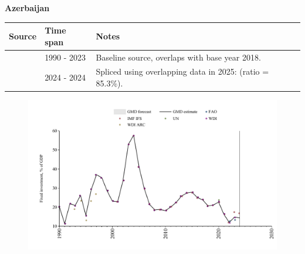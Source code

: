 \documentclass[12pt,a4paper,landscape]{article}
\begin{document}
\begin{adjustbox}{max totalsize={\paperwidth}{\paperheight},center}
\begin{minipage}[t][\textheight][t]{\textwidth}
\vspace*{0.5cm}
{}
\begin{center}
{\Large\bfseries Azerbaijan}
\end{center}
\vspace{0.5cm}
\begin{table}[H]
\centering
\small
\begin{tabular}{|l|l|l|}
\hline
\textbf{Source} & \textbf{Time span} & \textbf{Notes} \\
\hline
\rowcolor{white}\cite{WDI}& 1990 - 2023 &Baseline source, overlaps with base year 2018.\\
\rowcolor{lightgray}\cite{IMF_IFS}& 2024 - 2024 &Spliced using overlapping data in 2025: (ratio = 85.3\%).\\
\hline
\end{tabular}
\end{table}
\begin{figure}[H]
\centering
\includegraphics[width=\textwidth,height=0.6\textheight,keepaspectratio]{graphs/AZE_finv_GDP.pdf}
\end{figure}
\end{minipage}
\end{adjustbox}
\end{document}
